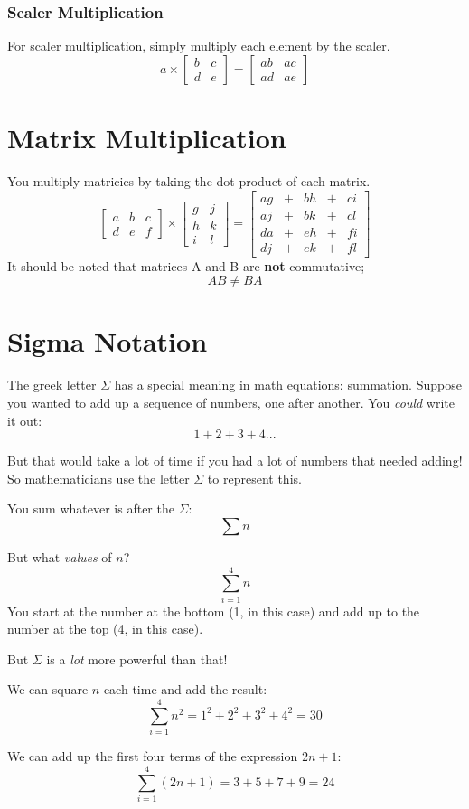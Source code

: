 \documentclass{article}
\begin{document}
\subsubsection{Scaler Multiplication}
	For scaler multiplication, simply multiply each element by the scaler.
	$$
	a
	\times
	\begin{bmatrix}
		b & c \\
		d & e
	\end{bmatrix}
	= 
	\begin{bmatrix}
		ab & ac \\
		ad & ae
	\end{bmatrix}
	$$

\section{Matrix Multiplication}
You multiply matricies by taking the dot product of each matrix. 
$$
\begin{bmatrix}
	a & b & c \\
	d & e & f
\end{bmatrix}
\times
\begin{bmatrix}
	g & j \\
	h & k \\
	i & l
\end{bmatrix}
= 
\begin{bmatrix}
ag & + & bh & + & ci \\
aj & + & bk & + & cl \\
da & + & eh & + & fi \\
dj & + & ek & + & fl
\end{bmatrix}
$$
It should be noted that matrices A and B are \textbf{not} commutative; 
$$AB \ne BA$$

\section{Sigma Notation}
The greek letter $\Sigma$ has a special meaning in math equations: summation. 
Suppose you wanted to add up a sequence of numbers, one after another. You \textit{could} write it out:
$$1 + 2 + 3 + 4...$$

But that would take a lot of time if you had a lot of numbers that needed adding! So mathematicians use the letter $\Sigma$ to represent this. 

You sum whatever is after the $\Sigma$:
$$\sum n$$

But what \textit{values} of $n$?
$$\sum_{i=1}^{4} n$$
You start at the number at the bottom (1, in this case) and add up to the number at the top (4, in this case).

But $\Sigma$ is a \textit{lot} more powerful than that!

We can square $n$ each time and add the result: 
$$\sum_{i=1}^{4} n^2 = 1^2 + 2^2 + 3^2 + 4^2 = 30$$

We can add up the first four terms of the expression $2n+1$:
$$\sum_{i=1}^{4} (2n+1) = 3 + 5 + 7 + 9 = 24$$
\end{document}
